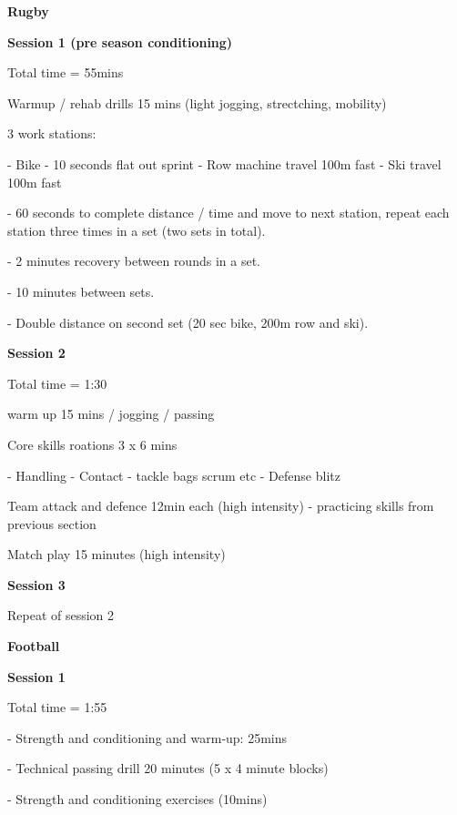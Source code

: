 \documentclass[man,floatsintext]{apa6}
\begin{document}
\begin{flushleft}

\begin{center}

  \textbf{Rugby}
  
\end{center}

  \textbf{Session 1 (pre season conditioning)}

Total time = 55mins

Warmup / rehab drills 15 mins (light jogging, strectching, mobility)

3 work stations:

- Bike - 10 seconds flat out sprint
- Row machine travel 100m fast
- Ski travel 100m fast

- 60 seconds to complete distance / time and move to next station, repeat each station three times in a set (two sets in total).

- 2 minutes recovery between rounds in a set.

- 10 minutes between sets.

- Double distance on second set (20 sec bike, 200m row and ski).


  \textbf{Session 2}

Total time = 1:30

warm up 15 mins / jogging / passing

Core skills roations 3 x 6 mins

  - Handling 
  - Contact - tackle bags scrum etc
  - Defense blitz
  
Team attack and defence 12min each (high intensity) - practicing skills from previous section

Match play 15 minutes (high intensity)


  \textbf{Session 3}

Repeat of session 2

\clearpage

\begin{center}

  \textbf{Football}
  
\end{center}

\textbf{Session 1}

Total time = 1:55

- Strength and conditioning and warm-up: 25mins

- Technical passing drill 20 minutes (5 x 4 minute blocks)

- Strength and conditioning exercises (10mins)


\end{flushleft}
\end{document}

